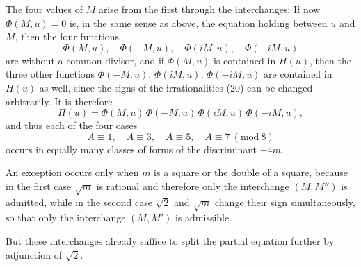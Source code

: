 The four values of $M$ arise from the first through the interchanges:
If now $\Phi(M,u) = 0$ is, in the same sense as above, the equation holding between $u$ and $M$, then the four functions
\[
\Phi(M,u), \quad \Phi(-M,u), \quad \Phi(iM,u), \quad \Phi(-iM,u)
\]
are without a common divisor, and if $\Phi(M,u)$ is contained in $H(u)$, then the three other functions $\Phi(-M,u)$, $\Phi(iM,u)$, $\Phi(-iM,u)$ are contained in $H(u)$ as well, since the signs of the irrationalities (20) can be changed arbitrarily. It is therefore
\[
H(u) = \Phi(M,u)\,\Phi(-M,u)\,\Phi(iM,u)\,\Phi(-iM,u),
\]
and thus each of the four cases
\[
A \equiv 1, \quad A \equiv 3, \quad A \equiv 5, \quad A \equiv 7\ (\mathrm{mod}\ 8)
\]
occurs in equally many classes of forms of the discriminant $-4m$.

An exception occurs only when $m$ is a square or the double of a square, because in the first case $\sqrt m$ is rational and therefore only the interchange $(M, M'')$ is admitted, while in the second case $\sqrt2$ and $\sqrt m$ change their sign simultaneously, so that only the interchange $(M, M')$ is admissible.

But these interchanges already suffice to split the partial equation further by adjunction of $\sqrt2$.
